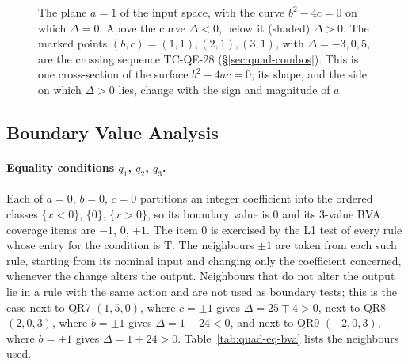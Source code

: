\documentclass[11pt,a4paper]{article}
\begin{document}
\begin{figure}[H]
\centering
{}
\caption{The plane \(a=1\) of the input space, with the curve
\(b^2-4c=0\) on which \(\Delta=0\). Above the curve \(\Delta<0\), below it
(shaded) \(\Delta>0\). The marked points \((b,c)=(1,1),(2,1),(3,1)\), with
\(\Delta=-3,0,5\), are the crossing sequence TC-QE-28
(\S\ref{sec:quad-combos}). This is one
cross-section of the surface \(b^2-4ac=0\); its shape, and the side on which
\(\Delta>0\) lies, change with the sign and magnitude of \(a\).}
\label{fig:quad-delta-slice}
\end{figure}

\subsection{Boundary Value Analysis}
\label{sec:quad-bva}

\paragraph{Equality conditions \(q_1\), \(q_2\), \(q_3\).} Each of \(a=0\),
\(b=0\), \(c=0\) partitions an integer coefficient into the ordered classes
\(\{x<0\}\), \(\{0\}\), \(\{x>0\}\), so its boundary value is \(0\) and its
3-value BVA coverage items are \(-1\), \(0\), \(+1\). The item \(0\) is
exercised by the L1 test of every rule whose entry for the condition is T.
The neighbours \(\pm1\) are taken from each such rule, starting from its
nominal input and changing only the coefficient concerned, whenever the
change alters the output. Neighbours that do not alter the output lie in a
rule with the same action and are not used as boundary tests; this is the
case next to QR7 \((1,5,0)\), where \(c=\pm1\) gives \(\Delta=25\mp4>0\),
next to QR8 \((2,0,3)\), where \(b=\pm1\) gives \(\Delta=1-24<0\), and next to
QR9 \((-2,0,3)\), where \(b=\pm1\) gives \(\Delta=1+24>0\).
Table~\ref{tab:quad-eq-bva} lists the neighbours used.
\end{document}
